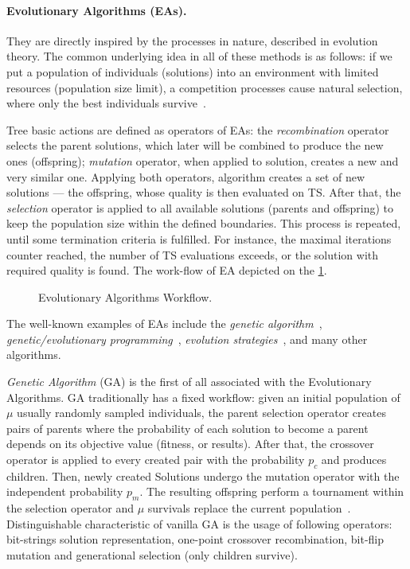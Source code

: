 \paragraph{Evolutionary Algorithms (EAs).} 
They are directly inspired by the processes in nature, described in evolution theory. The common underlying idea in all of these methods is as follows: if we put a population of individuals (solutions) into an environment with limited resources (population size limit), a competition processes cause natural selection, where only the best individuals survive~\cite{eiben2015evolutionary}.

Tree basic actions are defined as operators of EAs: the \emph{recombination} operator selects the parent solutions, which later will be combined to produce the new ones (offspring); \emph{mutation} operator, when applied to solution, creates a new and very similar one. Applying both operators, algorithm creates a set of new solutions — the offspring, whose quality is then evaluated on TS. After that, the \textit{selection} operator is applied to all available solutions (parents and offspring) to keep the population size within the defined boundaries. This process is repeated, until some termination criteria is fulfilled. For instance, the maximal iterations counter reached, the number of TS evaluations exceeds, or the solution with required quality is found. The work-flow of EA depicted on the \cref{bg:pic:EAs}.

\begin{figure}
	\centering
	
	\caption{Evolutionary Algorithms Workflow.}
	\label{bg:pic:EAs}
\end{figure}

The well-known examples of EAs include the \textit{genetic algorithm}~\cite{sastry2005genetic}, \textit{genetic/evolutionary programming}~\cite{koza1992evolution}, \textit{evolution strategies}~\cite{beyer2002evolution}, and many other algorithms.

\emph{Genetic Algorithm} (GA) is the first of all associated with the Evolutionary Algorithms. GA traditionally has a fixed workflow: given an initial population of $\mu$ usually randomly sampled individuals, the parent selection operator creates pairs of parents where the probability of each solution to become a parent depends on its objective value (fitness, or results). After that, the crossover operator is applied to every created pair with the probability $p_c$ and produces children. Then, newly created Solutions undergo the mutation operator with the independent probability $p_m$. The resulting offspring perform a tournament within the selection operator and $\mu$ survivals replace the current population~\cite{eiben2015popular}. Distinguishable characteristic of vanilla GA is the usage of following operators: bit-strings solution representation, one-point crossover recombination, bit-flip mutation and generational selection (only children survive).


